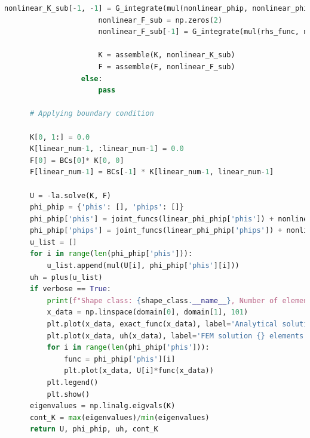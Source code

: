\documentclass[twoside,twocolumn,10pt]{article}
\begin{document}
\begin{lstlisting}[language=Python, caption=Finite elements methods in 1-D main code]
                      nonlinear_K_sub[-1, -1] = G_integrate(mul(nonlinear_phip, nonlinear_phip),N=N, scale=nonlinear_phip.scale)
                      nonlinear_F_sub = np.zeros(2)
                      nonlinear_F_sub[-1] = G_integrate(mul(rhs_func, nonlinear_phi), N=N, scale=nonlinear_phi.scale)
  
                      K = assemble(K, nonlinear_K_sub)
                      F = assemble(F, nonlinear_F_sub)
                  else:
                      pass
                  
      # Applying boundary condition
  
      K[0, 1:] = 0.0 
      K[linear_num-1, :linear_num-1] = 0.0
      F[0] = BCs[0]* K[0, 0] 
      F[linear_num-1] = BCs[-1] * K[linear_num-1, linear_num-1]
  
      U = -la.solve(K, F)
      phi_phip = {'phis': [], 'phips': []}
      phi_phip['phis'] = joint_funcs(linear_phi_phip['phis']) + nonlinear_phi_phip['phis']
      phi_phip['phips'] = joint_funcs(linear_phi_phip['phips']) + nonlinear_phi_phip['phips']
      u_list = []
      for i in range(len(phi_phip['phis'])):
          u_list.append(mul(U[i], phi_phip['phis'][i]))
      uh = plus(u_list)
      if verbose == True:
          print(f"Shape class: {shape_class.__name__}, Number of elements: {num_elems}, Polynomial order:{p},  Domain: {domain}, Boundary conditions: {BCs}")
          x_data = np.linspace(domain[0], domain[1], 101)
          plt.plot(x_data, exact_func(x_data), label='Analytical solution')
          plt.plot(x_data, uh(x_data), label='FEM solution {} elements'.format(num_elems))
          for i in range(len(phi_phip['phis'])):
              func = phi_phip['phis'][i]
              plt.plot(x_data, U[i]*func(x_data))
          plt.legend()
          plt.show()
      eigenvalues = np.linalg.eigvals(K)
      cont_K = max(eigenvalues)/min(eigenvalues)
      return U, phi_phip, uh, cont_K
  
\end{lstlisting}
\end{document}
